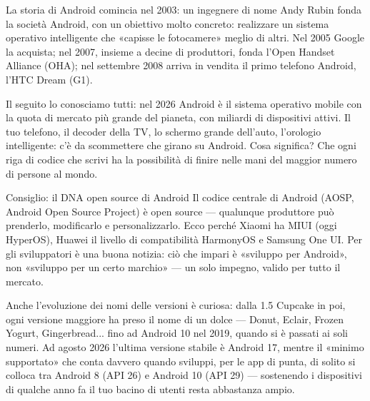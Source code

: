 


La storia di Android comincia nel 2003: un ingegnere di nome Andy Rubin fonda la società Android, con un obiettivo molto concreto: realizzare un sistema operativo intelligente che «capisse le fotocamere» meglio di altri. Nel 2005 Google la acquista; nel 2007, insieme a decine di produttori, fonda l'Open Handset Alliance (OHA); nel settembre 2008 arriva in vendita il primo telefono Android, l'HTC Dream (G1).

Il seguito lo conosciamo tutti: nel 2026 Android è il sistema operativo mobile con la quota di mercato più grande del pianeta, con miliardi di dispositivi attivi. Il tuo telefono, il decoder della TV, lo schermo grande dell'auto, l'orologio intelligente: c'è da scommettere che girano su Android. Cosa significa? Che ogni riga di codice che scrivi ha la possibilità di finire nelle mani del maggior numero di persone al mondo.

\begin{tcbinfo}{Consiglio: il DNA open source di Android}
Il codice centrale di Android (AOSP, Android Open Source Project) è open source — qualunque produttore può prenderlo, modificarlo e personalizzarlo. Ecco perché Xiaomi ha MIUI (oggi HyperOS), Huawei il livello di compatibilità HarmonyOS e Samsung One UI. Per gli sviluppatori è una buona notizia: ciò che impari è «sviluppo per Android», non «sviluppo per un certo marchio» — un solo impegno, valido per tutto il mercato.

\end{tcbinfo}

Anche l'evoluzione dei nomi delle versioni è curiosa: dalla 1.5 Cupcake in poi, ogni versione maggiore ha preso il nome di un dolce — Donut, Eclair, Frozen Yogurt, Gingerbread... fino ad Android 10 nel 2019, quando si è passati ai soli numeri. Ad agosto 2026 l'ultima versione stabile è Android 17, mentre il «minimo supportato» che conta davvero quando sviluppi, per le app di punta, di solito si colloca tra Android 8 (API 26) e Android 10 (API 29) — sostenendo i dispositivi di qualche anno fa il tuo bacino di utenti resta abbastanza ampio.

